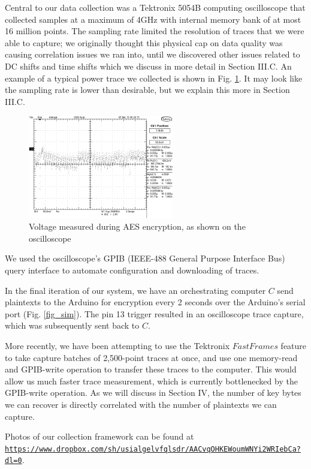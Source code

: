 \documentclass[journal]{ieee_style}
\begin{document}
Central to our data collection was a Tektronix 5054B computing oscilloscope that collected samples at a maximum of 4GHz with internal memory bank of at most 16 million points. The sampling rate limited the resolution of traces that we were able to capture; we originally thought this physical cap on data quality was causing correlation issues we ran into, until we discovered other issues related to DC shifts and time shifts which we discuss in more detail in Section III.C. An example of a typical power trace we collected is shown in Fig. \ref{pow}. It may look like the sampling rate is lower than desirable, but we explain this more in Section III.C.

\begin{figure}[!t]
\centering
\includegraphics[width=2.5in]{power_trace}
\caption{Voltage measured during AES encryption, as shown on the oscilloscope}
\label{pow}
\end{figure}


We used the oscilloscope's GPIB (IEEE-488 General Purpose Interface Bus) query interface to automate configuration and downloading of traces.

In the final iteration of our system, we have an orchestrating computer $C$ send plaintexts to the Arduino for encryption every 2 seconds over the Arduino's serial port (Fig. \ref{fig_sim}). The pin 13 trigger resulted in an oscilloscope trace capture, which was subsequently sent back to $C$. 

More recently, we have been attempting to use the Tektronix $Fast Frames$ feature to take capture batches of 2,500-point traces at once, and use one memory-read and GPIB-write operation to transfer these traces to the computer. This would allow us much faster trace measurement, which is currently bottlenecked by the GPIB-write operation. As we will discuss in Section IV, the number of key bytes we can recover is directly correlated with the number of plaintexts we can capture. 

Photos of our collection framework can be found at \texttt{\url{https://www.dropbox.com/sh/usialgelvfqlsdr/AACvqOHKEWoumWNYi2WRIebCa?dl=0}}. 
\end{document}

